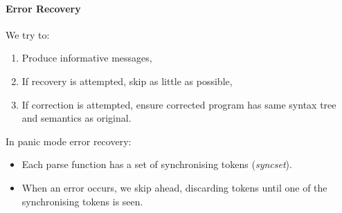 \documentclass[twocolumn,english]{article}
\begin{document}
\paragraph{Error Recovery}

We try to:
\begin{enumerate}
\item Produce informative messages,
\item If recovery is attempted, skip as little as possible,
\item If correction is attempted, ensure corrected program has same syntax
tree and semantics as original.
\end{enumerate}
In panic mode error recovery:
\begin{itemize}
\item Each parse function has a set of synchronising tokens (\emph{syncset}).
\item When an error occurs, we skip ahead, discarding tokens until one of
the synchronising tokens is seen.
\end{itemize}
\end{document}
